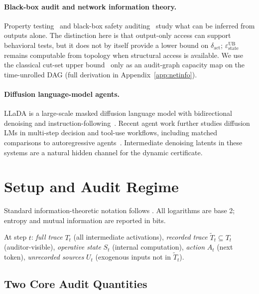 \documentclass{article}
\begin{document}
  \paragraph{Black-box audit and network information theory.}
  Property testing~\citep{goldreich1998property} and black-box safety
  auditing~\citep{casper2024blackbox,su2024mission} study what can be inferred
  from outputs alone. The distinction here is that output-only access can
  support behavioral tests, but it does not by itself provide a lower bound on
  $\delta_\text{act}$; $\varepsilon_\text{state}^\text{UB}$ remains computable
  from topology when structural access is available. We use the classical
  cut-set upper bound~\citep{elgamal2011network} only as an audit-graph
  capacity map on the time-unrolled DAG (full derivation in
  Appendix~\ref{app:netinfo}).

  \paragraph{Diffusion language-model agents.}
  LLaDA is a large-scale masked diffusion language model with bidirectional
  denoising and instruction-following~\citep{nie2025llada}. Recent agent work
  further studies diffusion LMs in multi-step decision and tool-use workflows,
  including matched comparisons to autoregressive
  agents~\citep{zhen2026dllmagent}. Intermediate denoising latents in these
  systems are a natural hidden channel for the dynamic certificate.

  \section{Setup and Audit Regime}
  \label{sec:setup}

  Standard information-theoretic notation follows \citet{cover2006elements}. All
   logarithms are base 2; entropy and mutual information are reported in bits.

  At step $t$: \emph{full trace} $T_t$ (all intermediate activations),
  \emph{recorded trace} $\tilde T_t \subseteq T_t$ (auditor-visible),
  \emph{operative state} $S_t$ (internal computation), \emph{action} $A_t$ (next
   token), \emph{unrecorded sources} $U_t$ (exogenous inputs not in $\tilde
  T_t$).

  \subsection{Two Core Audit Quantities}
\end{document}
